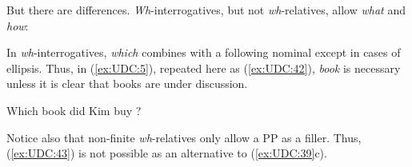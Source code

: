\documentclass[output=paper
	        ,collection
	        ,collectionchapter
 	        ,biblatex
                ,babelshorthands
                ,newtxmath
                ,draftmode
                ,colorlinks, citecolor=brown
]{langscibook}
\begin{document}
{\begin{exe} \ex \begin{xlist} \label{ex:UDC:38}

\end{xlist}
\end{exe}

\begin{exe} \ex \begin{xlist} \label{ex:UDC:39}

\end{xlist}
\end{exe}

\noindent
But there are differences. \emph{Wh}-interrogatives, but not
\emph{wh}-relatives, allow \emph{what} and \emph{how}:

\begin{exe} \ex \begin{xlist} \label{ex:UDC:40}

\end{xlist}
\end{exe}\noindent

\begin{exe} \ex \begin{xlist} \label{ex:UDC:41}

\end{xlist}
\end{exe}

\noindent
In \emph{wh}-interrogatives, \emph{which} combines with a following
nominal except in cases of ellipsis. Thus, in (\ref{ex:UDC:5}), repeated here as (\ref{ex:UDC:42}), \emph{book} is
necessary unless it is clear that books are under discussion.

\begin{exe}
\ex \label{ex:UDC:42}
 Which book did Kim buy \trace{}?
\end{exe}\noindent
Notice also that non-finite \emph{wh}-relatives only allow a PP as a
filler. Thus, (\ref{ex:UDC:43}) is not possible as an alternative to (\ref{ex:UDC:39}c).

\begin{exe}
     \label{ex:UDC:43}
\end{exe}

}
\end{document}
